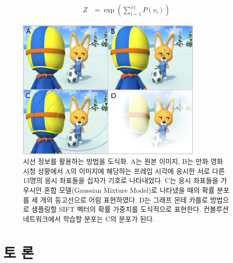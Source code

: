 \documentclass{kcc}
\begin{document}
\begin{equation} \label{eq4}
\begin{split}
Z & = \exp(\sum_{i=1}^{|v|}{P(v_{i})})
\end{split}
\end{equation}

\begin{figure}
  \centerline{\includegraphics[width=92mm,height=70mm]{eps/sel_fig2.png}}
  \caption{시선 정보를 활용하는 방법을 도식화. A는 원본 이미지, B는 만화 영화 시청 상황에서 A의 이미지에 해당하는 프레임 시각에 응시한 서로 다른 13명의 응시 좌표들을 십자가 기호로 나타내었다. C는 응시 좌표들을 가우시안 혼합 모델(Gaussian Mixture Model)로 나타냈을 때의 확률 분포를 세 개의 등고선으로 어림 표현하였다. D는 그래프 몬테 카를로 방법으로 샘플링할 SIFT 벡터의 확률 가중치를 도식적으로 표현한다. 컨볼루션 네트워크에서 학습할 분포는 C의 분포가 된다.}
  \label{fig:selective}
\end{figure}

\section{토 론}
\end{document}
